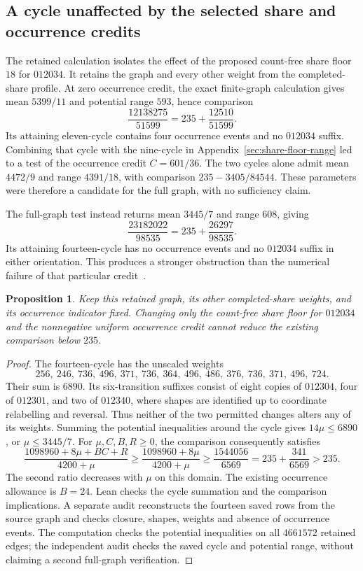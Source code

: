 \documentclass[11pt,a4paper]{article}
\newtheorem{proposition}[theorem]{Proposition}
\theoremstyle{definition}
\theoremstyle{remark}
\begin{document}
\subsection{A cycle unaffected by the selected share and occurrence credits}\label{sec:share18-unaffected-cycle}
The retained calculation isolates the effect of the proposed count-free share
floor $18$ for $012034$. It retains the graph and every other weight from
the completed-share profile. At zero occurrence credit, the exact finite-graph
calculation gives mean $5399/11$ and potential range $593$, hence comparison
\[
\frac{12138275}{51599}=235+\frac{12510}{51599}.
\]
Its attaining eleven-cycle contains four occurrence events and no $012034$
suffix. Combining that cycle with the nine-cycle in Appendix~\ref{sec:share-floor-range} led to a test of
the occurrence credit $C=601/36$. The two cycles alone admit mean $4472/9$
and range $4391/18$, with comparison $235-3405/84544$. These parameters
were therefore a candidate for the full graph, with no sufficiency claim.

The full-graph test instead returns mean $3445/7$ and range $608$, giving
\[
\frac{23182022}{98535}=235+\frac{26297}{98535}.
\]
Its attaining fourteen-cycle has no occurrence events and no $012034$
suffix in either orientation. This produces a stronger obstruction than
the numerical failure of that particular credit~\cite{share144archive}.

\begin{proposition}\label{prop:share18-independent-obstruction}
Keep this retained graph, its other completed-share weights, and its
occurrence indicator fixed. Changing only the count-free share floor for
$012034$ and the nonnegative uniform occurrence credit cannot reduce the
existing comparison below $235$.
\end{proposition}
\begin{proof}
The fourteen-cycle has the unscaled weights
\[
256,\ 246,\ 736,\ 496,\ 371,\ 736,\ 364,\
496,\ 486,\ 376,\ 736,\ 371,\ 496,\ 724.
\]
Their sum is $6890$. Its six-transition suffixes consist of eight copies
of $012304$, four of $012301$, and two of $012340$, where shapes are
identified up to coordinate relabelling and reversal. Thus neither of the
two permitted changes alters any of its weights. Summing the potential
inequalities around the cycle gives $14\mu\le6890$, or $\mu\le3445/7$.
For $\mu,C,B,R\ge0$, the comparison consequently satisfies
\[
\frac{1098960+8\mu+BC+R}{4200+\mu}
\ge\frac{1098960+8\mu}{4200+\mu}
\ge\frac{1544056}{6569}
=235+\frac{341}{6569}>235.
\]
The second ratio decreases with $\mu$ on this domain. The existing
occurrence allowance is $B=24$. Lean checks the cycle summation and the
comparison implications. A separate audit reconstructs the fourteen saved
rows from the source graph and checks closure, shapes, weights and absence
of occurrence events. The computation checks the potential inequalities
on all $4661572$ retained edges; the independent audit checks the saved
cycle and potential range, without claiming a second full-graph verification.
\end{proof}
\end{document}
